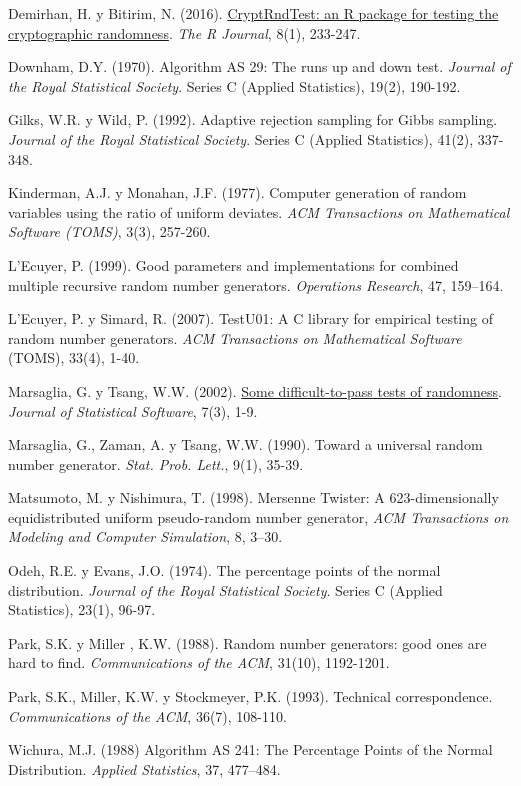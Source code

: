 \documentclass[
]{book}
\theoremstyle{break}
\theoremstyle{definition}
\theoremstyle{definition}
\theoremstyle{definition}
\theoremstyle{remark}
\begin{document}
Demirhan, H. y Bitirim, N. (2016). \href{https://journal.r-project.org/archive/2016/RJ-2016-016/index.html}{CryptRndTest: an R package for testing the cryptographic randomness}.
\emph{The R Journal}, 8(1), 233-247.

Downham, D.Y. (1970). Algorithm AS 29: The runs up and down test. \emph{Journal of the Royal Statistical Society}. Series C (Applied Statistics), 19(2), 190-192.

Gilks, W.R. y Wild, P. (1992). Adaptive rejection sampling for Gibbs sampling. \emph{Journal of the Royal Statistical Society}. Series C (Applied Statistics), 41(2), 337-348.

Kinderman, A.J. y Monahan, J.F. (1977). Computer generation of random variables using the ratio of uniform deviates. \emph{ACM Transactions on Mathematical Software (TOMS)}, 3(3), 257-260.

L'Ecuyer, P. (1999). Good parameters and implementations for combined multiple recursive random number generators. \emph{Operations Research}, 47, 159--164.

L'Ecuyer, P. y Simard, R. (2007). TestU01: A C library for empirical testing of random number generators. \emph{ACM Transactions on Mathematical Software} (TOMS), 33(4), 1-40.

Marsaglia, G. y Tsang, W.W. (2002). \href{http://www.jstatsoft.org/v07/i03}{Some difficult-to-pass tests of randomness}. \emph{Journal of Statistical Software}, 7(3), 1-9.

Marsaglia, G., Zaman, A. y Tsang, W.W. (1990). Toward a universal random number generator. \emph{Stat. Prob. Lett.}, 9(1), 35-39.

Matsumoto, M. y Nishimura, T. (1998). Mersenne Twister: A 623-dimensionally equidistributed uniform pseudo-random number generator, \emph{ACM Transactions on Modeling and Computer Simulation}, 8, 3--30.

Odeh, R.E. y Evans, J.O. (1974). The percentage points of the normal distribution. \emph{Journal of the Royal Statistical Society}. Series C (Applied Statistics), 23(1), 96-97.

Park, S.K. y Miller , K.W. (1988). Random number generators: good ones are hard to find. \emph{Communications of the ACM}, 31(10), 1192-1201.

Park, S.K., Miller, K.W. y Stockmeyer, P.K. (1993). Technical correspondence. \emph{Communications of the ACM}, 36(7), 108-110.

Wichura, M.J. (1988) Algorithm AS 241: The Percentage Points of the Normal Distribution. \emph{Applied Statistics}, 37, 477--484.
\end{document}
